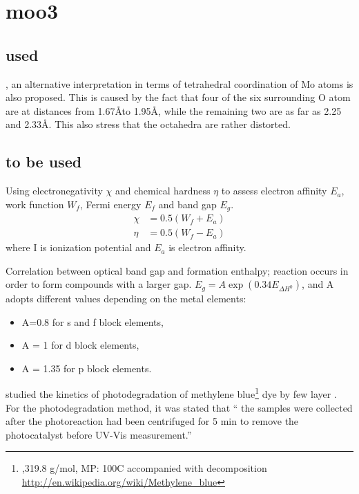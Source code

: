 \section{moo3}

\subsection{used}



, an alternative interpretation in terms of tetrahedral coordination of Mo atoms is also proposed. This is caused by the fact that four of the six surrounding O atom are at distances from 1.67\AA to 1.95\AA, while the remaining two are as far as 2.25 and 2.33\AA. This also stress that the  octahedra are rather distorted.


\subsection{to be used}


\cite{Matar2011} Using electronegativity $\chi$ and chemical hardness $\eta$ to assess electron affinity $E_a$, work function $W_f$, Fermi energy $E_f$ and band gap $E_g$.
\begin{align}
\chi &= 0.5(W_f + E_a)\\
\eta & = 0.5(W_f - E_a)
\end{align}
where I is ionization potential and $E_a$ is electron affinity.

Correlation between optical band gap and formation enthalpy; reaction occurs in order to form compounds with a larger gap.  $E_g = A \exp(0.34E_{\Delta H^0})$, and A adopts different values depending on the metal elements:
\begin{itemize}
\item A=0.8 for s and f block elements,
\item A = 1 for d block elements,
\item A = 1.35 for p block elements.
\end{itemize}


\citeauthor{Sreedhara2013} studied the kinetics of photodegradation of methylene blue\footnote{,319.8 g/mol, MP: 100C accompanied with decomposition \url{http://en.wikipedia.org/wiki/Methylene_blue}} dye by few layer .
For the photodegradation method, it was stated that `` the samples were collected after the photoreaction had been centrifuged for 5 min to remove the photocatalyst before UV-Vis measurement.''


